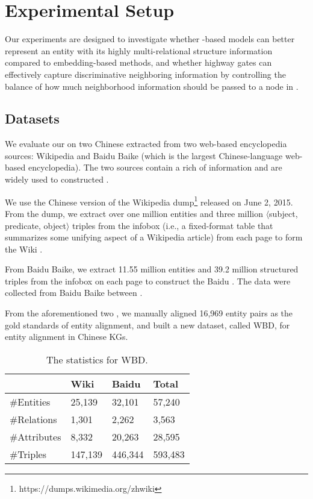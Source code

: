 \section{Experimental Setup}
	Our experiments are designed to investigate whether \RGCN-based models can better represent an entity with its highly multi-relational
structure information compared to \KG embedding-based methods, and whether highway gates can effectively capture discriminative neighboring
information by controlling the balance of how much neighborhood information should be passed to a node in \RGCN.

\subsection{Datasets}
	We evaluate our on two Chinese \KGs extracted from two web-based encyclopedia sources: Wikipedia and Baidu Baike (which is the largest Chinese-language web-based encyclopedia). The two sources contain a rich of information and are widely used to constructed \KGs.
	
	We use the Chinese version of the Wikipedia dump\footnote{https://dumps.wikimedia.org/zhwiki} released on June 2, 2015.
    From the dump, we extract over one million entities and three million $\langle$subject, predicate, object$\rangle$ triples from the infobox (i.e., a fixed-format table that summarizes some unifying aspect of a Wikipedia article) from each page to form the Wiki \KG.
	
	 From Baidu Baike, we extract 11.55 million entities and 39.2 million structured triples from the infobox on each page to construct the Baidu \KG. The data were collected from Baidu Baike between .

	
	 From the aforementioned two \KGs, we manually aligned 16,969 entity pairs as the gold standards of entity alignment, and built a new dataset, called WBD, for entity alignment in Chinese KGs. 
	

	\begin{table}
		\centering
		\begin{tabular}{llll}
			\toprule
			& Wiki & Baidu & Total \\
			\midrule
			\#Entities & 25,139 & 32,101 & 57,240 \\
			\#Relations & 1,301 & 2,262 & 3,563 \\
			\#Attributes & 8,332 & 20,263 & 28,595 \\
			\#Triples & 147,139 & 446,344 & 593,483 \\
			\bottomrule
		\end{tabular}
		\caption{The statistics for WBD.}
		\label{dataset}
	\end{table}
	
